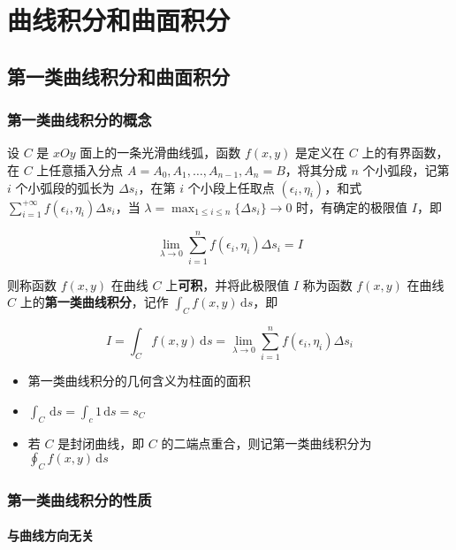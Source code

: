 \documentclass[lang = zh , final , oneside , openany , titlepage , zihao = -4 , linespread = 1.3 , baselineskip = false , cjk-font = windows , text-font = newtx , math-font = newtx]{sjtureport}
\begin{document}
\chapter{曲线积分和曲面积分}

\section{第一类曲线积分和曲面积分}

\subsection{第一类曲线积分的概念}

\begin{definition}
    设 \(C\) 是 \(xOy\) 面上的一条光滑曲线弧，函数 \(f(x,y)\) 是定义在 \(C\)
上的有界函数，在 \(C\) 上任意插入分点
\(A = A_0,A_1,\ldots,A_{n-1},A_n=B\)，将其分成 \(n\) 个小弧段，记第
\(i\) 个小弧段的弧长为 \(\Delta s_i\)，在第 \(i\) 个小段上任取点
\((\epsilon_i,\eta_i)\)，和式
\(\displaystyle\sum_{i=1}^{+\infty}f(\epsilon_i,\eta_i)\Delta s_i\)，当
\(\displaystyle\lambda=\max_{1\leq i\leq n}\{\Delta s_i\}\to 0\)
时，有确定的极限值 \(I\)，即

\[\lim_{\lambda\to 0}\sum_{i=1}^nf(\epsilon_i,\eta_i)\Delta s_i = I\]

则称函数 \(f(x,y)\) 在曲线 \(C\) 上\textbf{可积}，并将此极限值 \(I\)
称为函数 \(f(x,y)\) 在曲线 \(C\) 上的\textbf{第一类曲线积分}，记作
\(\displaystyle\int_Cf(x,y)\,\mathrm{d}s\)，即

\[I = \int_C f(x,y)\,\mathrm{d}s = \lim_{\lambda\to 0}\sum_{i=1}^nf(\epsilon_i,\eta_i)\Delta s_i\]
\end{definition}

\begin{itemize}
\item
  第一类曲线积分的几何含义为柱面的面积
\item
  \(\displaystyle\int_C\,\mathrm{d}s = \displaystyle\int_c1\,\mathrm{d}s=s_C\)
\item
  若 \(C\) 是封闭曲线，即 \(C\) 的二端点重合，则记第一类曲线积分为
  \(\displaystyle\oint_Cf(x,y)\,\mathrm{d}s\)
\end{itemize}

\subsection{第一类曲线积分的性质}

\subsubsection{与曲线方向无关}
\end{document}
